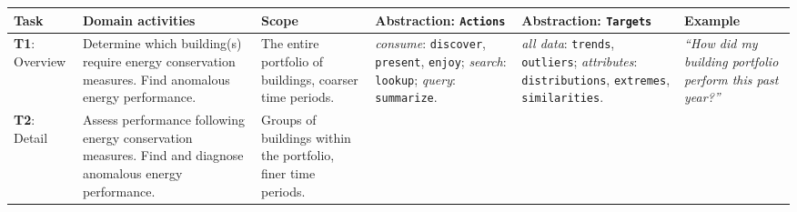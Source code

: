 \documentclass[journal]{vgtc}                %
\begin{document}
\begin{table}[bp]\renewcommand{\arraystretch}{1.2}\addtolength{\tabcolsep}{-1pt}
    \vspace{-.3cm}
    \begin{center}
    \scriptsize
    \begin{tabular}{p{}|>{\RaggedRight}p{}|>{\RaggedRight}p{}|>{\RaggedRight}p{}|>{\RaggedRight}p{}|>{\RaggedRight}p{}}

        \rowcolor{nmYellow}
    
        {\bf Task} & \cellcolor{nmOrange} {\bf Domain activities} & {\bf Scope} & {\bf Abstraction: {\tt Actions}} & {\bf Abstraction: {\tt Targets}} & {\bf Example}
        
        \\
        
        \hline  
        
        \cellcolor{nmYellow} {\bf T1}: Overview 
        
        & \cellcolor{nmOrange} Determine which building(s) require energy conservation measures. Find anomalous energy performance.
        
        & The entire portfolio of buildings, coarser time periods. 
        
        & {\it consume}: {\tt discover}, {\tt present}, {\tt enjoy}; {\it search}: {\tt lookup}; {\it query}: {\tt summarize}.
        
        & {\it all data}: {\tt trends}, {\tt outliers}; {\it attributes}: {\tt distributions}, {\tt extremes}, {\tt similarities}. 
        
        & {\it ``How did my building portfolio perform this past year?''}
        
        \\
        
        \hline
        
        \cellcolor{nmYellow} {\bf T2}: Detail 
        
        & \cellcolor{nmOrange} Assess performance following energy conservation measures. Find and diagnose anomalous energy performance. 
        
        & Groups of buildings within the portfolio, finer time periods.
        

\end{tabular}
\end{center}
\end{table}
\end{document}
